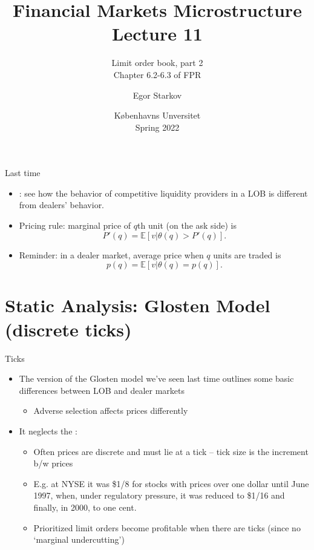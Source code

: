 \documentclass[english,10pt
,aspectratio=169
]{beamer}
\title{Financial Markets Microstructure \\ Lecture 11}
\subtitle{Limit order book, part 2\\
	Chapter 6.2-6.3 of FPR}
\author{Egor Starkov}
\date{K{\o}benhavns Unversitet \\
	Spring 2022}
\begin{document}
\frame[plain]{\titlepage}


\begin{frame}{Last time}
	\begin{itemize}
		\item {}: see how the behavior of competitive liquidity providers in a LOB is different from dealers' behavior.
		\item Pricing rule: \alert{marginal price} of $q$th unit (on the ask side) is $$P'(q) = \mathbb{E} [v | \theta(q) > P'(q)].$$
		\item Reminder: in a dealer market, average price when $q$ units are traded is $$p(q) = \mathbb{E} [v | \theta(q) = p(q)].$$
	\end{itemize}
\end{frame}


\section{Static Analysis: Glosten Model (discrete ticks)}

\begin{frame}{Ticks}
	\begin{itemize}
		\item The version of the Glosten model we've seen last time outlines some basic differences between LOB and dealer markets
		\begin{itemize}
			\item Adverse selection affects prices differently
		\end{itemize}
		\item It neglects the :
		\begin{itemize}
			\item Often prices are discrete and must lie at a tick --  tick size is the increment b/w prices
			\item E.g. at NYSE it was \$1/8 for stocks with prices over one dollar until June 1997, when, under regulatory pressure, it was reduced to \$1/16 and finally, in 2000, to one cent.
			\item Prioritized limit orders become profitable when there are ticks (since no `marginal undercutting')
		\end{itemize}
	\end{itemize}
\end{frame}
\end{document}
